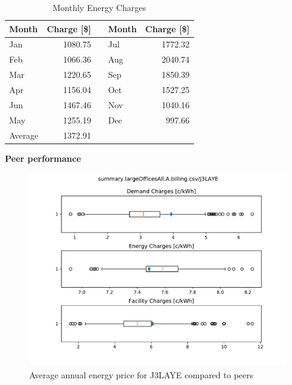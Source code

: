 \documentclass[11pt]{article}
\begin{document}
\begin{table}[th!]
  \centering
  \caption{Monthly Energy Charges}
  \vspace{1.5ex}
  \label{tab:energy}
  \begin{tabular}{p{0.75in}rp{0.2in}p{0.75in}r}
    Month & Charge [\$] & & Month & Charge [\$] \\
    \midrule
    Jan & 1080.75 & & Jul & 1772.32 \\
    Feb & 1066.36 & & Aug & 2040.74 \\
    Mar & 1220.65 & & Sep & 1850.39 \\
    Apr & 1156.04 & & Oct & 1527.25 \\
    Jun & 1467.46 & & Nov & 1040.16 \\
    May & 1255.19 & & Dec & 997.66 \\
    \midrule
    Average & 1372.91 & & &
  \end{tabular}
\end{table}

\vspace{3ex}
\textbf{\Large Peer performance}
\vspace{1ex}

\lipsum[1][1-7]

\begin{figure}[!h]
\centering
\includegraphics[width=\columnwidth, page=1, trim=0in 2.1in 0in 2.1in, clip]{visuals/J3LAYE.whiskerchart.pdf}
\caption{Average annual energy price for J3LAYE compared to peers}
\label{fig:PeerCompEn}
\end{figure}

\clearpage
\end{document}

